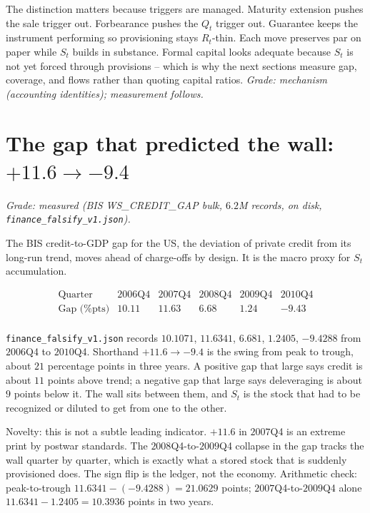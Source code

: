 The distinction matters because triggers are managed. Maturity extension pushes the sale trigger out. Forbearance pushes the $Q_t$ trigger out. Guarantee keeps the instrument performing so provisioning stays $R_t$-thin. Each move preserves par on paper while $S_t$ builds in substance. Formal capital looks adequate because $S_t$ is not yet forced through provisions -- which is why the next sections measure gap, coverage, and flows rather than quoting capital ratios. \textit{Grade: mechanism (accounting identities); measurement follows.}

\section{The gap that predicted the wall: $+11.6\to -9.4$}
\label{sec:bis-gap}

\textit{Grade: measured (BIS WS\_CREDIT\_GAP bulk, $6.2$M records, on disk, \texttt{finance\_falsify\_v1.json}).}

The BIS credit-to-GDP gap for the US, the deviation of private credit from its long-run trend, moves ahead of charge-offs by design. It is the macro proxy for $S_t$ accumulation.

\[
\begin{array}{lccccc}
\text{Quarter} & 2006\text{Q4} & 2007\text{Q4} & 2008\text{Q4} & 2009\text{Q4} & 2010\text{Q4} \\
\text{Gap (\% pts)} & 10.11 & 11.63 & 6.68 & 1.24 & -9.43 \\
\end{array}
\]

\texttt{finance\_falsify\_v1.json} records $10.1071$, $11.6341$, $6.681$, $1.2405$, $-9.4288$ from $2006$Q4 to $2010$Q4. Shorthand $+11.6\to-9.4$ is the swing from peak to trough, about $21$ percentage points in three years. A positive gap that large says credit is about $11$ points above trend; a negative gap that large says deleveraging is about $9$ points below it. The wall sits between them, and $S_t$ is the stock that had to be recognized or diluted to get from one to the other.

Novelty: this is not a subtle leading indicator. $+11.6$ in $2007$Q4 is an extreme print by postwar standards. The $2008$Q4-to-$2009$Q4 collapse in the gap tracks the wall quarter by quarter, which is exactly what a stored stock that is suddenly provisioned does. The sign flip is the ledger, not the economy. Arithmetic check: peak-to-trough $11.6341-(-9.4288)=21.0629$ points; $2007$Q4-to-$2009$Q4 alone $11.6341-1.2405=10.3936$ points in two years.

